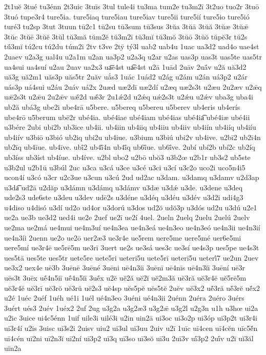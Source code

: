 {2t1uĕ
3tué
tu3énn
2t3uic
3tuīs
3tul
tule4i
tu3ma
tum2e
tu3m2ī
3t2uo
tuo2r
3tuō
3tuó
tupe3r4
ture5ia.
ture5iaq
ture5iau
ture5iav
ture5ii
ture5ií
ture5io
ture5ió
turé3
tu2sp
3tut
3tuun
tū2c1
tū2su
tū3sum
tū3sus
3tŭa
3tŭā
3tŭă
3tŭæ
3tŭǣ
3tŭc
3tŭē
3tŭĕ
3tŭl
tŭ3mă
tŭm2ĕ
tŭ3m2ī
tŭ3mĭ
tŭ3mŏ
3tŭō
3tŭŏ
tŭpĕ3r
tŭ2s
tŭ́3mĭ
tú2cu
tú2du
túm2i
2tv
t3ve
2tȳ
tý3l
uab2
uab4u
1uac
ua3d2
uad4o
uae4st
2uaev
u2a3g
ual4u
u2a1m
u2an
ua3p2
u2a3q
u2ar
u2as
uas3p
uas3t
uas5te
uas5tr
ua4sui
ua4suí
u2au
2uav
ua2x3
ua͞e4st
ua͡e4st
u2ā
1uād
2uāv
2uā́v
u2ă
uă3d2
uă3g
uă2m1
uăs3p
uăs5tr
2uăv
uắs3
1uác
1uád2
u2ág
u2ám
u2án
uá3p2
u2ár
uás3p
uá4sui
u2áu
2uáv
uá2x
2uæd
uæ2dī
uæ2dí
u2æq
uæ2s3t
u2æu
2u2æv
u2ǣq
uǣ2s3t
u2ǣu
2u2ǣv
uǣ́2d
uǣ́3r
2u1ǽ2d
u2ǽq
uǽ2s3t
u2ǽu
u2ǽv
uba3g
uba4i
ub2ă
ubá3g
ube2i
ube4rā
u5bere.
u5bereq
u5bereu
u5berev
ub4eris
ub4erís
ube4rō
u5berum
ubē2r
ubé4ia.
ubé4iae
ubé4iam
ubé4ias
ubé4ia͡
ubé4iæ
ubé4ii
u3bére
2ubi
ubi2b
ub3ice
ub4ii.
ub4iin
ub4iiq
ub4iiu
ub4iiv
ub4iín
ub4iíq
ub4iíu
ub4iív
u3biō
u3bió
ub2iq
ubi2u
ub4iue.
u3bium
u3biú
ubi2v
ub4ive.
u2bī2
ub2ī4n
ub2īq
ub4īue.
ub4īve.
ubī́2
ub4ī́4n
ub4ī́q
ub6ī́ue.
ub6ī́ve.
2ubí
ubí2b
ubí2c
ub2íq
ub3íss
ub3íst
ub4íue.
ub4íve.
u2bl
ubo2
u2bō
ubŏ3
u3b2œ
u2b1r
ub3s2
ub5ste
u3b2ul
u2b1ū
u3búl
2uc
u3ca
u3cá
u3ce
u3cé
u3ci
u3cí
u3c2o
uco2i
uco5n4i5
ucon4í
u3có
u3cr
u2c3ue
u3cun
u3cú
2ud
ud2ac
u3dam.
u3damq
u3damv
u2d3ap
u3da͡
ud2ā
u2dăp
u3dámn
u3dámq
u3dámv
u3dæ
u3dǽ
u3de.
u3dene
u3deq
ude2s3
ude6ste
u3deu
u3dev
udē2s
u3déne
u3déq
u3déu
u3dév
u3d2i
udi4g3
u4diso
u4disó
u3dí
ud2o
ud4or
u3dorú
u3dos
ud2ŏ
udŏ3p
u3dós
ud2u
u3dú
u2e1
ue2a
ue3b
ue3d2
ued4i
ue2e
2uef
ue2ī
ue2í
4uel.
2ueln
2uelq
2uelu
2uelú
2uelv
ue2ma
ue2má
ue4mui
ue4m3uí
ue4n3ea
ue4n3eá
ue4n3eo
ue4n3eó
ue4n3ii
ue4n3ií
ue4n3íi
2uenn
ue2o
ue2ō
uer2æ3
ue3r4e
ue5rem
uere5me
uere5mé
uer6e5mi
uere5mí
ue3r4ē
ue5rē5m
ue3rī
3uert
ue2s
ue3sá
ues3c
ue3sí
ue4s3p
ues5pe
ue4s3t
ues5tā
ues5te
ues5tr
uete5re
uete5ri
ueteri5u
uete5rī
ueterī5u
ueterī́7
ue2un
2uev
ue3x2
uex4e
uē3b
3uēnē
3uēné
3uēni
uē4n3iī
3uēnī
uē4nīs
uē4n3ĭī
3uēní
uē3r
uēs3t
3uēx
uḗ4n5iī
uḗ4n5ĭī
3uḗx
u2ĕ
uĕ2ă
uĕ2ĭ
uĕ2m3ă
uĕ3ră
uĕ3r4ē
uĕ5rē5m
uĕ3r4ĕ
uĕ3rī
uĕ3rŏ
uĕ3rŭ
uĕ2s3
uĕ4sp
uĕs5pĕ
uĕs5tĕ
2uĕv
uĕ3x2
uĕ́3ră
uĕ́3rĕ
uĕ́x2
u2é
1uéc
2uéf
1uéh
ué1i
1uél
ué4n3eo
3uéni
ué4n3ii
2uénn
2uéra
2uéro
3uérs
3uért
ués3
2uév
1uéx2
2uf
2ug
u3g2a
u3g2æ3
u3g2ǣ
u3g2l
u2g3n
u1h
u3hœ
ui2a
u2ic
3uice
ui4c5énn
1uif
uile3i
uilé3i
u2in
uin2ā
ui3oc
ui3o2p
ui3óp
ui3p2t
ui3r4i
ui3r4í
u2is
3uisc
ui3s2i
2uisv
uiu2
ui3ul
ui3uu
2uiv
u2ī
1uīc
uī4cen
uī4cĕn
uīc5ĕ́n
uī4cén
uī2ni
uī2n3ĭ
uī2ní
uī3p2
uī3q
uī3so
uī3sŏ
uī3u
2uī3v
uī́3p2
2uī́v
u2ĭ
uĭ3ăl
uĭn2a
}
